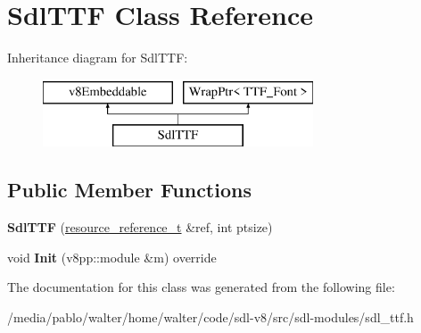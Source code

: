 \hypertarget{classSdlTTF}{}\section{Sdl\+T\+TF Class Reference}
\label{classSdlTTF}
Inheritance diagram for Sdl\+T\+TF\+:\begin{figure}[H]
\begin{center}
\leavevmode
\includegraphics[height=2.000000cm]{classSdlTTF}
\end{center}
\end{figure}
\subsection*{Public Member Functions}
\begin{DoxyCompactItemize}
\item 
\mbox{\label{classSdlTTF_ac3bba3d017f2d110432bfa0cacbb8c82}} 
{\bfseries Sdl\+T\+TF} (\mbox{\hyperlink{classWrapPtr}{resource\+\_\+reference\+\_\+t}} \&ref, int ptsize)
\item 
\mbox{\label{classSdlTTF_a6aea0cc75e0e3edb933e6623fb6aba75}} 
void {\bfseries Init} (v8pp\+::module \&m) override
\end{DoxyCompactItemize}


The documentation for this class was generated from the following file\+:\begin{DoxyCompactItemize}
\item 
/media/pablo/walter/home/walter/code/sdl-\/v8/src/sdl-\/modules/sdl\+\_\+ttf.\+h\end{DoxyCompactItemize}
